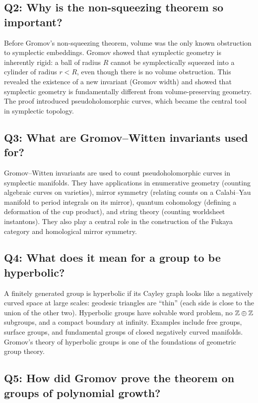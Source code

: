 \subsection*{Q2: Why is the non-squeezing theorem so important?}

Before Gromov's non-squeezing theorem, volume was the only known obstruction to symplectic embeddings. Gromov showed that symplectic geometry is inherently rigid: a ball of radius \(R\) cannot be symplectically squeezed into a cylinder of radius \(r < R\), even though there is no volume obstruction. This revealed the existence of a new invariant (Gromov width) and showed that symplectic geometry is fundamentally different from volume-preserving geometry. The proof introduced pseudoholomorphic curves, which became the central tool in symplectic topology.

\subsection*{Q3: What are Gromov--Witten invariants used for?}

Gromov--Witten invariants are used to count pseudoholomorphic curves in symplectic manifolds. They have applications in enumerative geometry (counting algebraic curves on varieties), mirror symmetry (relating counts on a Calabi--Yau manifold to period integrals on its mirror), quantum cohomology (defining a deformation of the cup product), and string theory (counting worldsheet instantons). They also play a central role in the construction of the Fukaya category and homological mirror symmetry.

\subsection*{Q4: What does it mean for a group to be hyperbolic?}

A finitely generated group is hyperbolic if its Cayley graph looks like a negatively curved space at large scales: geodesic triangles are ``thin'' (each side is close to the union of the other two). Hyperbolic groups have solvable word problem, no \(\mathbb{Z} \oplus \mathbb{Z}\) subgroups, and a compact boundary at infinity. Examples include free groups, surface groups, and fundamental groups of closed negatively curved manifolds. Gromov's theory of hyperbolic groups is one of the foundations of geometric group theory.

\subsection*{Q5: How did Gromov prove the theorem on groups of polynomial growth?}


